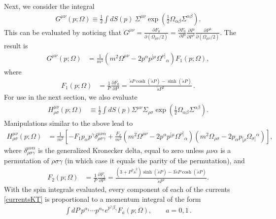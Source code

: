 \documentclass[12pt,aps,prd,nofootinbib,noshowkeys,noshowpacs,longbibliography,
superscriptaddress,tightenlines,floatfix,preprintnumbers]{revtex4-2}
\newcommand{\p}{\partial}
\begin{document}
Next, we consider the integral
\begin{align}
    G^{\mu\nu}(p; \Omega) \equiv \frac{1}{2}\int dS(p)\  \Sigma^{\mu\nu} \exp\left( \frac{1}{2}\Omega_{\alpha\beta}\Sigma^{\alpha\beta}\right).
\end{align}
This can be evaluated by noticing that $G^{\mu\nu} = \frac{\p F_0}{\p(\Omega_{\mu\nu}/2)} = \frac{\p F_0}{\p P}\frac{\p P}{\p P^\lambda} \frac{\p P^\lambda}{\p(\Omega_{\mu\nu}/2)}$. The result is
\begin{align}
    G^{\mu\nu}(p; \Omega) &= \frac{1}{m^2}\left( m^2\Omega^{\mu\nu} - 2p^\alpha p^{[\mu}\Omega^{\nu]}{}_\alpha\right)F_1(p; \Omega),
\end{align}
where
\begin{align} \label{F1}
    F_1(p; \Omega) &= \frac{1}{P}\frac{\p F_0}{\p P} = \frac{\tilde{s} P\cosh(\tilde{s} P)-\sinh(\tilde{s} P)}{\tilde{s} P^3}\,.
\end{align}
For use in the next section, we also evaluate
\begin{align}
    H^{\mu\nu}_{\rho\sigma}(p; \Omega) &\equiv \frac{1}{2}\int dS(p) \Sigma^{\mu\nu} \Sigma_{\rho\sigma} \exp\left(\frac{1}{2}\Omega_{\alpha\beta}\Sigma^{\alpha\beta}\right).
\end{align}
Manipulations similar to the above lead to
\begin{align}
     H^{\mu\nu}_{\rho\sigma}(p; \Omega) &= \frac{1}{m^2}\left[ - F_1p_\alpha p^\gamma\delta^{\mu\nu\alpha}_{\rho\sigma\gamma} + \frac{F_2}{m^2}\left(m^2\Omega^{\mu\nu}-2p^\alpha p^{[\mu}\Omega^{\nu]}{}_\alpha \right)\left(m^2\Omega_{\rho\sigma}-2p_\alpha p_{[\rho}\Omega_{\sigma]}{}^\alpha \right) \right],
\end{align}
where $\delta^{\mu\nu\alpha}_{\rho\sigma\gamma}$ is the generalized Kronecker delta, equal to zero unless $\mu\nu\alpha$ is a permutation of $\rho\sigma\gamma$ (in which case it equals the parity of the permutation), and
\begin{align} \label{F2}
    F_2(p; \Omega) &= \frac{1}{P}\frac{\p F_1}{\p P} = \frac{(3+P^2 \tilde{s}^2 ) \sinh(\tilde{s} P) - 3 \tilde{s} P \cosh(\tilde{s} P)}{\tilde{s} P^5}.
\end{align}
With the spin integrals evaluated, every component of each of the currents \eqref{currentsKT} is proportional to a momentum integral of the form
\begin{align} \label{integralsoftheform}
    \int dP\ p^{\alpha_1}\cdots p^{\alpha_n}e^{p^\gamma \beta_\gamma}F_a(p; \Omega), \qquad a=0,1\,.
\end{align}
\end{document}
